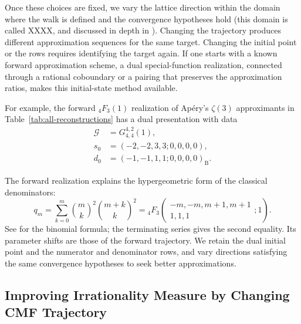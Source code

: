 \documentclass[oneside,english,11pt]{amsart}
\begin{document}
Once these choices are fixed, we vary the lattice direction within the domain where the walk is defined and the convergence hypotheses hold (this domain is called XXXX, and discussed in depth in \cite{weinbaum2025conservative}). Changing the trajectory produces different approximation sequences for the same target. 
Changing the initial point or the rows requires identifying the target
again. 
If one starts with a known forward approximation scheme, a dual special-function realization, connected through a rational coboundary or a pairing that preserves the approximation ratios, makes this initial-state method available.

For example, the forward ${}_4F_3(1)$ realization of Ap\'ery's $\zeta(3)$ approximants in Table~\ref{tab:all-reconstructions} has a dual presentation with data
\begin{equation}
\begin{aligned}
 \mathcal G&=G^{4,2}_{4,4}(1),\\
 s_0&=(-2,-2,3,3;0,0,0,0),\\
 d_0&=(-1,-1,1,1;0,0,0,0)_{\mathrm B}.
\end{aligned}
\label{eq:z3-seed-dual-setup}
\end{equation}

The forward realization explains the hypergeometric form of the classical denominators:
\begin{equation}
 q_m=\sum_{k=0}^{m}\binom{m}{k}^{\!2}\binom{m+k}{k}^{\!2}
 ={}_4F_3\!\left(
 \begin{matrix}-m,-m,m+1,m+1\\1,1,1\end{matrix};1\right).
 \label{eq:apery-hypergeometric-denominators}
\end{equation}
See \cite[Section~1.1, equation~(19)]{zudilin2011arithmeticHypergeometric}
for the binomial formula; the terminating series gives the second equality. Its parameter shifts are those of the forward trajectory. We retain the dual initial point and the numerator and denominator rows, and vary directions satisfying the same convergence hypotheses to seek better approximations.

\subsection{Improving Irrationality Measure by Changing CMF Trajectory}
\label{subsec:changing-traj}

\end{document}
